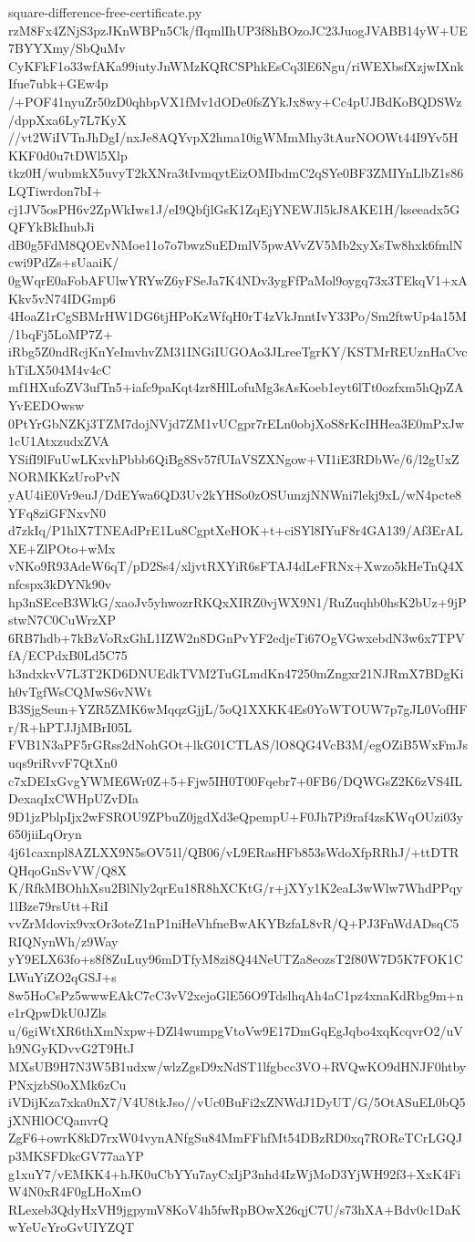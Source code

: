\documentclass[11pt]{article}
\theoremstyle{definition}
\theoremstyle{remark}
\begin{document}
\begin{filecontents*}[overwrite]{square-difference-free-certificate.py}
rzM8Fx4ZNjS3pzJKnWBPn5Ck/fIqmlIhUP3f8hBOzoJC23JuogJVABB14yW+UE7BYYXmy/SbQuMv
CyKFkF1o33wfAKa99iutyJnWMzKQRCSPhkEsCq3lE6Ngu/riWEXbsfXzjwIXnkIfue7ubk+GEw4p
/+POF41nyuZr50zD0qhbpVX1fMv1dODe0fsZYkJx8wy+Cc4pUJBdKoBQDSWz/dppXxa6Ly7L7KyX
//vt2WiIVTnJhDgI/nxJe8AQYvpX2hma10igWMmMhy3tAurNOOWt44I9Yv5HKKF0d0u7tDWl5Xlp
tkz0H/wubmkX5uvyT2kXNra3tIvmqytEizOMIbdmC2qSYe0BF3ZMIYnLlbZ1s86LQTiwrdon7bI+
cj1JV5osPH6v2ZpWkIws1J/eI9QbfjlGsK1ZqEjYNEWJl5kJ8AKE1H/kseeadx5GQFYkBkIhubJi
dB0g5FdM8QOEvNMoe11o7o7bwzSuEDmlV5pwAVvZV5Mb2xyXsTw8hxk6fmlNcwi9PdZs+sUaaiK/
0gWqrE0aFobAFUlwYRYwZ6yFSeJa7K4NDv3ygFfPaMol9oygq73x3TEkqV1+xAKkv5vN74IDGmp6
4HoaZ1rCgSBMrHW1DG6tjHPoKzWfqH0rT4zVkJnntIvY33Po/Sm2ftwUp4a15M/1bqFj5LoMP7Z+
iRbg5Z0ndRcjKnYeImvhvZM31INGiIUGOAo3JLreeTgrKY/KSTMrREUznHaCvchTiLX504M4v4cC
mf1HXufoZV3ufTn5+iafc9paKqt4zr8HlLofuMg3sAsKoeb1eyt6lTt0ozfxm5hQpZAYvEEDOwsw
0PtYrGbNZKj3TZM7dojNVjd7ZM1vUCgpr7rELn0objXoS8rKcIHHea3E0mPxJw1cU1AtxzudxZVA
YSifI9lFuUwLKxvhPbbb6QiBg8Sv57fUIaVSZXNgow+VI1iE3RDbWe/6/l2gUxZNORMKKzUroPvN
yAU4iE0Vr9euJ/DdEYwa6QD3Uv2kYHSo0zOSUunzjNNWni7lekj9xL/wN4pcte8YFq8ziGFNxvN0
d7zkIq/P1hlX7TNEAdPrE1Lu8CgptXeHOK+t+ciSYl8IYuF8r4GA139/Af3ErALXE+ZlPOto+wMx
vNKo9R93AdeW6qT/pD2Ss4/xljvtRXYiR6sFTAJ4dLeFRNx+Xwzo5kHeTnQ4Xnfcspx3kDYNk90v
hp3nSEceB3WkG/xaoJv5yhwozrRKQxXIRZ0vjWX9N1/RuZuqhb0hsK2bUz+9jPstwN7C0CuWrzXP
6RB7hdb+7kBzVoRxGhL1IZW2n8DGnPvYF2edjeTi67OgVGwxebdN3w6x7TPVfA/ECPdxB0Ld5C75
h3ndxkvV7L3T2KD6DNUEdkTVM2TuGLmdKn47250mZngxr21NJRmX7BDgKih0vTgfWsCQMwS6vNWt
B3SjgSeun+YZR5ZMK6wMqqzGjjL/5oQ1XXKK4Es0YoWTOUW7p7gJL0VofHFr/R+hPTJJjMBrI05L
FVB1N3aPF5rGRss2dNohGOt+lkG01CTLAS/lO8QG4VcB3M/egOZiB5WxFmJsuqs9riRvvF7QtXn0
c7xDEIxGvgYWME6Wr0Z+5+Fjw5IH0T00Fqebr7+0FB6/DQWGsZ2K6zVS4ILDexaqIxCWHpUZvDIa
9D1jzPblpIjx2wFSROU9ZPbuZ0jgdXd3eQpempU+F0Jh7Pi9raf4zsKWqOUzi03y650jiiLqOryn
4j61caxnpl8AZLXX9N5sOV51l/QB06/vL9ERasHFb853sWdoXfpRRhJ/+ttDTRQHqoGnSvVW/Q8X
K/RfkMBOhhXsu2BlNly2qrEu18R8hXCKtG/r+jXYy1K2eaL3wWlw7WhdPPqy1lBze79rsUtt+RiI
vvZrMdovix9vxOr3oteZ1nP1niHeVhfneBwAKYBzfaL8vR/Q+PJ3FnWdADsqC5RIQNynWh/z9Way
yY9ELX63fo+s8f8ZuLuy96mDTfyM8zi8Q44NeUTZa8eozsT2f80W7D5K7FOK1CLWuYiZO2qGSJ+s
8w5HoCsPz5wwwEAkC7cC3vV2xejoGlE56O9TdslhqAh4aC1pz4xnaKdRbg9m+ne1rQpwDkU0JZls
u/6giWtXR6thXmNxpw+DZl4wumpgVtoVw9E17DmGqEgJqbo4xqKcqvrO2/uVh9NGyKDvvG2T9HtJ
MXsUB9H7N3W5B1udxw/wlzZgsD9xNdST1lfgbcc3VO+RVQwKO9dHNJF0htbyPNxjzbS0oXMk6zCu
iVDijKza7xka0nX7/V4U8tkJso//vUc0BuFi2xZNWdJ1DyUT/G/5OtASuEL0bQ5jXNHlOCQanvrQ
ZgF6+owrK8kD7rxW04vynANfgSu84MmFFhfMt54DBzRD0xq7ROReTCrLGQJp3MKSFDkcGV77aaYP
g1xuY7/vEMKK4+hJK0uCbYYu7ayCxIjP3nhd4IzWjMoD3YjWH92f3+XxK4FiW4N0xR4F0gLHoXmO
RLexeb3QdyHxVH9jgpymV8KoV4h5fwRpBOwX26qjC7U/s73hXA+Bdv0c1DaKwYeUcYroGvUIYZQT

\end{filecontents*}
\end{document}
